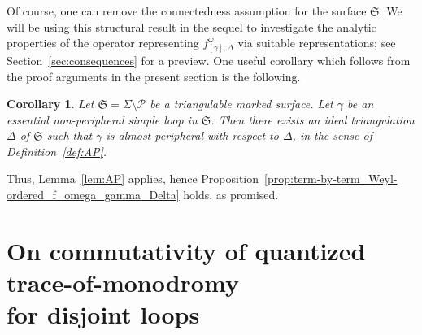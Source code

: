 \documentclass[pdftex]{sigma}
\numberwithin{equation}{section}
\newtheorem{Corollary}[Theorem]{Corollary}
\theoremstyle{definition}
\begin{document}
Of course, one can remove the connectedness assumption for the surface $\mathfrak{S}$. We will be using this structural result in the sequel \cite{sequel} to investigate the analytic properties of the operator representing $f^\omega_{[\gamma],\Delta}$ via suitable representations; see Section~\ref{sec:consequences} for a preview.
One useful corollary which follows from the proof arguments in the present section is the following.
\begin{Corollary}\label{cor:AP}
Let $\mathfrak{S}= \Sigma\setminus\mathcal{P}$ be a triangulable marked surface. Let $\gamma$ be an essential non-peripheral simple loop in $\mathfrak{S}$. Then there exists an ideal triangulation $\Delta$ of $\mathfrak{S}$ such that $\gamma$ is almost-peripheral with respect to $\Delta$, in the sense of Definition~{\rm \ref{def:AP}}.
\end{Corollary}
Thus, Lemma~\ref{lem:AP} applies, hence Proposition~\ref{prop:term-by-term_Weyl-ordered_f_omega_gamma_Delta} holds, as promised.
\section[On commutativity of quantized trace-of-monodromy for disjoint loops]{On commutativity of quantized trace-of-monodromy \\ for disjoint loops}
\label{sec:on_commutativity}
\end{document}
